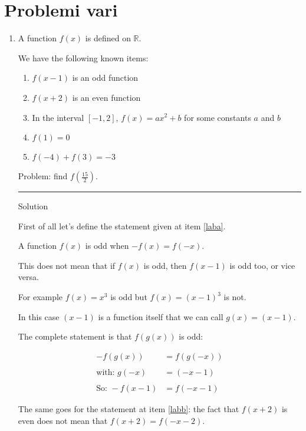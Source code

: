 \section{Problemi vari}
\begin{enumerate}
\item 
A function $f(x)$ is defined on $\mathbb{R}$.

We have the following known items:

\begin{enumerate}
\item $f(x-1)$ is an odd function \label{laba}
\item $f(x+2)$ is an even function \label{labb}
\item In the interval $[-1,2]$, $f(x)=ax^2+b$ for some constants $a$ and $b$ \label{labc}
\item $f(1)=0$ \label{labd}
\item $f(-4)+f(3)=-3$ \label{labe}
\end{enumerate}

\vspace{1cm}
Problem: find $f(\frac{15}{2})$.

\vspace{1cm}
\hrule
\vspace{1cm}

Solution

First of all let's define the statement given at item \ref{laba}.

A function $f(x)$ is odd when $-f(x)=f(-x)$.

This does not mean that if $f(x)$ is odd, then $f(x-1)$ is odd too, or vice versa.

For example $f(x)=x^3$ is odd but $f(x)=(x-1)^3$ is not.

In this case $(x-1)$ is a function itself that we can call $g(x)=(x-1)$.

The complete statement is that $f(g(x))$ is odd:

\begin{equation}
\begin{split}
-f(g(x))&=f(g(-x))\\
\\
\textrm{with: } g(-x)&=(-x-1)\\
\\
\textrm{So: }-f(x-1)&=f(-x-1)
\end{split}
\end{equation}

The same goes for the statement at item \ref{labb}: the fact that $f(x+2)$ is even does not mean that $f(x+2)=f(-x-2)$.


\end{enumerate}
